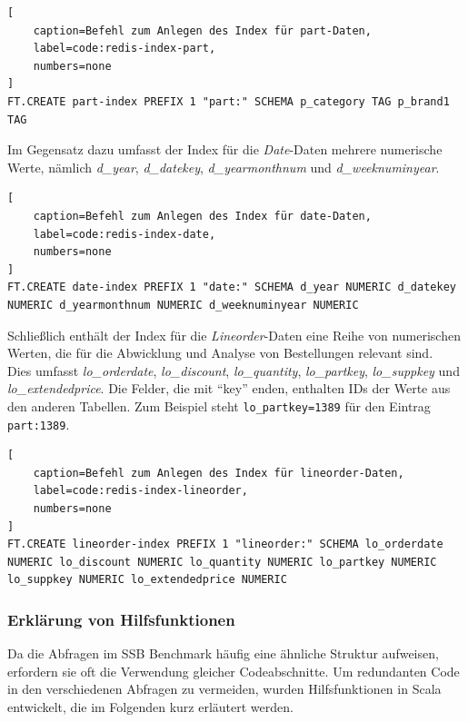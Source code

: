 \begin{lstlisting}[
    caption=Befehl zum Anlegen des Index für part-Daten,
    label=code:redis-index-part,
    numbers=none
]
FT.CREATE part-index PREFIX 1 "part:" SCHEMA p_category TAG p_brand1 TAG
\end{lstlisting}


Im Gegensatz dazu umfasst der Index für die \emph{Date}-Daten mehrere numerische Werte, nämlich \emph{d\_year}, \emph{d\_datekey}, \emph{d\_yearmonthnum} und \emph{d\_weeknuminyear}. 

\begin{lstlisting}[
    caption=Befehl zum Anlegen des Index für date-Daten,
    label=code:redis-index-date,
    numbers=none
]
FT.CREATE date-index PREFIX 1 "date:" SCHEMA d_year NUMERIC d_datekey NUMERIC d_yearmonthnum NUMERIC d_weeknuminyear NUMERIC
\end{lstlisting}


Schließlich enthält der Index für die \emph{Lineorder}-Daten eine Reihe von numerischen Werten, die für die Abwicklung und Analyse von Bestellungen relevant sind.\\
Dies umfasst \emph{lo\_orderdate}, \emph{lo\_discount}, \emph{lo\_quantity}, \emph{lo\_partkey}, \emph{lo\_suppkey} und \emph{lo\_extendedprice}. Die Felder, die mit \enquote{key} enden, enthalten IDs der Werte aus den anderen Tabellen. Zum Beispiel steht \lstinline|lo_partkey=1389| für den Eintrag \lstinline|part:1389|.

\begin{lstlisting}[
    caption=Befehl zum Anlegen des Index für lineorder-Daten,
    label=code:redis-index-lineorder,
    numbers=none
]
FT.CREATE lineorder-index PREFIX 1 "lineorder:" SCHEMA lo_orderdate NUMERIC lo_discount NUMERIC lo_quantity NUMERIC lo_partkey NUMERIC lo_suppkey NUMERIC lo_extendedprice NUMERIC
\end{lstlisting}


\subsubsection{Erklärung von Hilfsfunktionen}\label{sec:redis-scale-helper}
Da die Abfragen im SSB Benchmark häufig eine ähnliche Struktur aufweisen, erfordern sie oft die Verwendung gleicher Codeabschnitte. Um redundanten Code in den verschiedenen Abfragen zu vermeiden, wurden Hilfsfunktionen in Scala entwickelt, die im Folgenden kurz erläutert werden.

